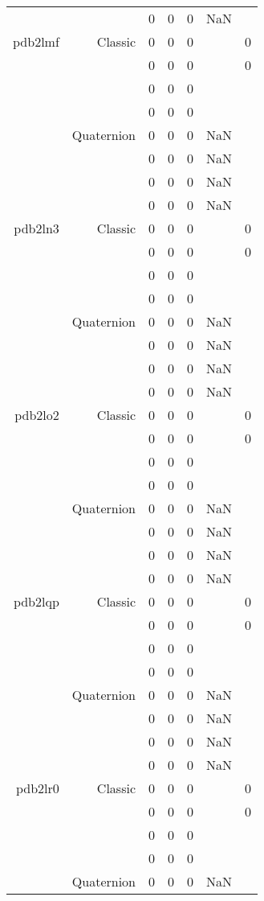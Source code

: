 \begin{xltabular}{\textwidth}{r|rcccSc}
& & 0 & 0 & 0 & NaN & \\ \addlinespace
pdb2lmf & Classic & 0 & 0 & 0 & & 0 \\
& & 0 & 0 & 0 & & 0 \\
& & 0 & 0 & 0 & & \\
& & 0 & 0 & 0 & & \\
& Quaternion & 0 & 0 & 0 & NaN & \\
& & 0 & 0 & 0 & NaN & \\
& & 0 & 0 & 0 & NaN & \\
& & 0 & 0 & 0 & NaN & \\ \addlinespace
pdb2ln3 & Classic & 0 & 0 & 0 & & 0 \\
& & 0 & 0 & 0 & & 0 \\
& & 0 & 0 & 0 & & \\
& & 0 & 0 & 0 & & \\
& Quaternion & 0 & 0 & 0 & NaN & \\
& & 0 & 0 & 0 & NaN & \\
& & 0 & 0 & 0 & NaN & \\
& & 0 & 0 & 0 & NaN & \\ \addlinespace
pdb2lo2 & Classic & 0 & 0 & 0 & & 0 \\
& & 0 & 0 & 0 & & 0 \\
& & 0 & 0 & 0 & & \\
& & 0 & 0 & 0 & & \\
& Quaternion & 0 & 0 & 0 & NaN & \\
& & 0 & 0 & 0 & NaN & \\
& & 0 & 0 & 0 & NaN & \\
& & 0 & 0 & 0 & NaN & \\ \addlinespace
pdb2lqp & Classic & 0 & 0 & 0 & & 0 \\
& & 0 & 0 & 0 & & 0 \\
& & 0 & 0 & 0 & & \\
& & 0 & 0 & 0 & & \\
& Quaternion & 0 & 0 & 0 & NaN & \\
& & 0 & 0 & 0 & NaN & \\
& & 0 & 0 & 0 & NaN & \\
& & 0 & 0 & 0 & NaN & \\ \addlinespace
pdb2lr0 & Classic & 0 & 0 & 0 & & 0 \\
& & 0 & 0 & 0 & & 0 \\
& & 0 & 0 & 0 & & \\
& & 0 & 0 & 0 & & \\
& Quaternion & 0 & 0 & 0 & NaN & \\

\end{xltabular}
